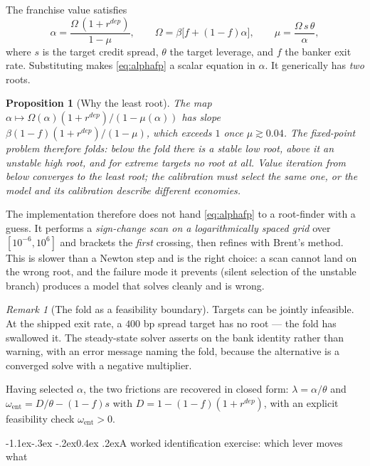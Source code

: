 \documentclass[10pt,a4paper]{article}
\makeatletter
\theoremstyle{definition}
\theoremstyle{plain}
\newtheorem{prop}[defn]{Proposition}
\theoremstyle{remark}
\newtheorem{rem}[defn]{Remark}
\renewcommand\subsection{\@startsection{subsection}{2}{\z@}%
  {-1.1ex\@plus -.3ex \@minus -.2ex}{0.4ex \@plus .2ex}{\normalfont\normalsize\bfseries}}
\makeatother
\begin{document}
The franchise value satisfies
\begin{equation}
  \alpha = \frac{\Omega\,(1+r^{dep})}{1-\mu},\qquad
  \Omega = \beta\big[f + (1-f)\alpha\big],\qquad
  \mu = \frac{\Omega\,s\,\theta}{\alpha},
  \label{eq:alphafp}
\end{equation}
where $s$ is the target credit spread, $\theta$ the target leverage, and $f$ the banker exit
rate. Substituting makes \eqref{eq:alphafp} a scalar equation in $\alpha$. It generically has
\emph{two} roots.

\begin{prop}[Why the least root]
The map $\alpha\mapsto \Omega(\alpha)(1+r^{dep})/(1-\mu(\alpha))$ has slope
$\beta(1-f)(1+r^{dep})/(1-\mu)$, which exceeds $1$ once $\mu \gtrsim 0.04$. The fixed-point
problem therefore \emph{folds}: below the fold there is a stable low root, above it an
unstable high root, and for extreme targets no root at all. Value iteration from below
converges to the \emph{least} root; the calibration must select the same one, or the model and
its calibration describe different economies.
\end{prop}

\noindent The implementation therefore does not hand \eqref{eq:alphafp} to a root-finder with
a guess. It performs a \emph{sign-change scan on a logarithmically spaced grid} over
$[10^{-6},10^{6}]$ and brackets the \emph{first} crossing, then refines with Brent's method.
This is slower than a Newton step and is the right choice: a scan cannot land on the wrong
root, and the failure mode it prevents (silent selection of the unstable branch) produces a
model that solves cleanly and is wrong.

\begin{rem}[The fold as a feasibility boundary]
Targets can be jointly infeasible. At the shipped exit rate, a $400$ bp spread target has no
root --- the fold has swallowed it. The steady-state solver asserts on the bank identity
rather than warning, with an error message naming the fold, because the alternative is a
converged solve with a negative multiplier.
\end{rem}

Having selected $\alpha$, the two frictions are recovered in closed form:
$\lambda = \alpha/\theta$ and $\omega_{\mathrm{ent}} = D/\theta - (1-f)s$ with
$D = 1 - (1-f)(1+r^{dep})$, with an explicit feasibility check
$\omega_{\mathrm{ent}}>0$.

\subsection{A worked identification exercise: which lever moves what}
\end{document}
